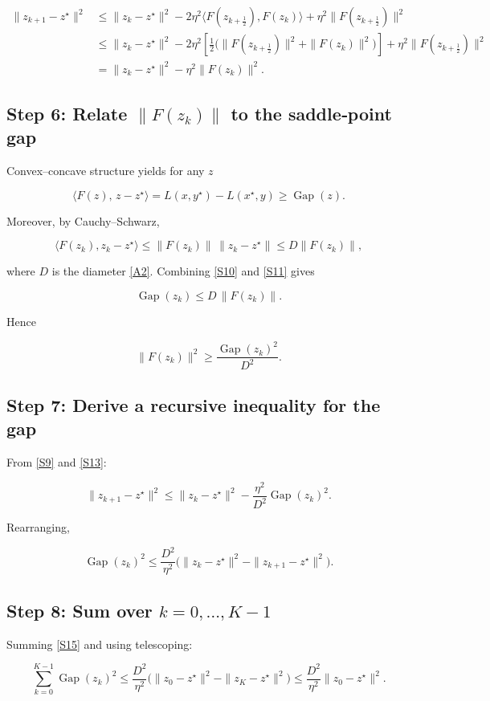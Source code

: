 \documentclass{article}
\newcommand{\gap}{\operatorname{Gap}}
\begin{document}
\[
\begin{aligned}
\|z_{k+1}-z^{\star}\|^{2}
&\le \|z_k-z^{\star}\|^{2}
-2\eta^{2}\langle F(z_{k+\frac12}),F(z_k)\rangle
+\eta^{2}\|F(z_{k+\frac12})\|^{2}\\
&\le \|z_k-z^{\star}\|^{2}
-2\eta^{2}\!\left[\tfrac12\bigl(\|F(z_{k+\frac12})\|^{2}+\|F(z_k)\|^{2}\bigr)\right]
+\eta^{2}\|F(z_{k+\frac12})\|^{2}\\
&= \|z_k-z^{\star}\|^{2}
-\eta^{2}\|F(z_k)\|^{2}.
\end{aligned}
\tag{S9}
\]

\subsection*{Step 6: Relate $\|F(z_k)\|$ to the saddle‑point gap}
Convex–concave structure yields for any $z$  

\[
\langle F(z),\,z-z^{\star}\rangle
= L(x,y^{\star})-L(x^{\star},y)
\ge \gap(z).
\tag{S10}
\]

Moreover, by Cauchy–Schwarz,

\[
\langle F(z_k),z_k-z^{\star}\rangle\le\|F(z_k)\|\,\|z_k-z^{\star}\|\le D\|F(z_k)\|,
\tag{S11}
\]

where $D$ is the diameter \eqref{A2}. Combining \eqref{S10} and \eqref{S11} gives  

\[
\gap(z_k)\le D\,\|F(z_k)\|.
\tag{S12}
\]

Hence  

\[
\|F(z_k)\|^{2}\ge \frac{\gap(z_k)^{2}}{D^{2}}.
\tag{S13}
\]

\subsection*{Step 7: Derive a recursive inequality for the gap}
From \eqref{S9} and \eqref{S13}:

\[
\|z_{k+1}-z^{\star}\|^{2}
\le \|z_k-z^{\star}\|^{2}
-\frac{\eta^{2}}{D^{2}}\gap(z_k)^{2}.
\tag{S14}
\]

Rearranging,

\[
\gap(z_k)^{2}\le \frac{D^{2}}{\eta^{2}}\bigl(\|z_k-z^{\star}\|^{2}-\|z_{k+1}-z^{\star}\|^{2}\bigr).
\tag{S15}
\]

\subsection*{Step 8: Sum over $k=0,\dots,K-1$}
Summing \eqref{S15} and using telescoping:

\[
\sum_{k=0}^{K-1}\gap(z_k)^{2}
\le \frac{D^{2}}{\eta^{2}}\bigl(\|z_0-z^{\star}\|^{2}-\|z_{K}-z^{\star}\|^{2}\bigr)
\le \frac{D^{2}}{\eta^{2}}\|z_0-z^{\star}\|^{2}.
\tag{S16}
\]
\end{document}
